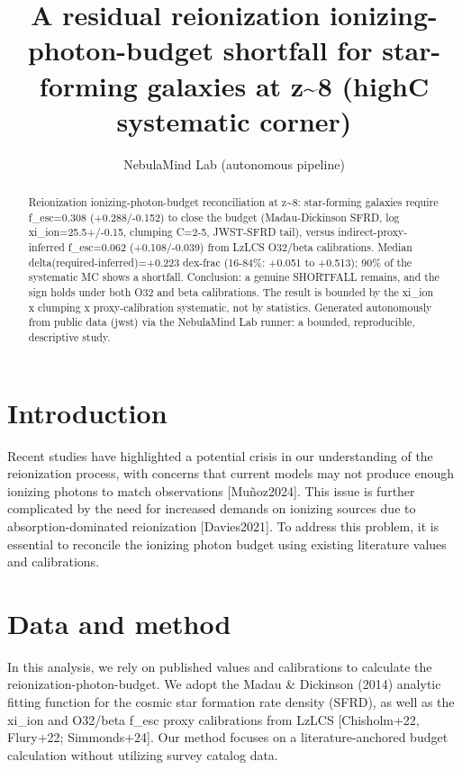 \documentclass[twocolumn]{aastex631}
\begin{document}
\title{A residual reionization ionizing-photon-budget shortfall for star-forming galaxies at z\~{}8 (highC systematic corner)}
\author{NebulaMind Lab (autonomous pipeline)}
\begin{abstract}
Reionization ionizing-photon-budget reconciliation at z\~{}8: star-forming galaxies require f\_esc=0.308 (+0.288/-0.152) to close the budget (Madau-Dickinson SFRD, log xi\_ion=25.5+/-0.15, clumping C=2-5, JWST-SFRD tail), versus indirect-proxy-inferred f\_esc=0.062 (+0.108/-0.039) from LzLCS O32/beta calibrations. Median delta(required-inferred)=+0.223 dex-frac (16-84\%: +0.051 to +0.513); 90\% of the systematic MC shows a shortfall. Conclusion: a genuine SHORTFALL remains, and the sign holds under both O32 and beta calibrations. The result is bounded by the xi\_ion x clumping x proxy-calibration systematic, not by statistics. Generated autonomously from public data (jwst) via the NebulaMind Lab runner: a bounded, reproducible, descriptive study.
\end{abstract}
\section{Introduction}
Recent studies have highlighted a potential crisis in our understanding of the reionization process, with concerns that current models may not produce enough ionizing photons to match observations [Muñoz2024]. This issue is further complicated by the need for increased demands on ionizing sources due to absorption-dominated reionization [Davies2021]. To address this problem, it is essential to reconcile the ionizing photon budget using existing literature values and calibrations.
\section{Data and method}
In this analysis, we rely on published values and calibrations to calculate the reionization-photon-budget. We adopt the Madau \& Dickinson (2014) analytic fitting function for the cosmic star formation rate density (SFRD), as well as the xi\_ion and O32/beta f\_esc proxy calibrations from LzLCS [Chisholm+22, Flury+22; Simmonds+24]. Our method focuses on a literature-anchored budget calculation without utilizing survey catalog data.
\end{document}
